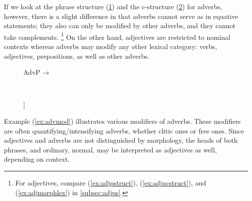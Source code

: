 If we look at the phrase structure (\ref{ex:advpstruct}) and the c-structure
(\ref{ex:advpcstruct}) for adverbs, however, there is a slight difference in
that adverbs cannot serve as \Plink{} in equative statements; they also can
only be modified by other adverbs, and they cannot take complements.%
\footnote{For adjectives, compare (\ref{ex:adjpstruct}),
(\ref{ex:adjpcstruct}), and (\ref{ex:adjmorphlex}) in \autoref{subsec:adjps}.}
On the other hand, adjectives are restricted to nominal contexts whereas
adverbs may modify any other lexical category: verbs, adjectives, prepositions,
as well as other adverbs.

\begin{figure}[h]
\ex\label{ex:advpstruct}
AdvP →  
\xe
\end{figure}

\begin{figure}[h]
\ex~\label{ex:advpcstruct}
\begin{forest}
[{\anno[\elem{\Adjc}]{AdvP}}
		[\anno{\xhead{Adv}}]
		[{\anno[{\elem{\Adjc}}]{AdvP}}]
]
\end{forest}
\xe
\end{figure}

Example (\ref{ex:advmod}) illustrates various modifiers of adverbs. These
modifiers are often quantifying/intensifying adverbs, whether clitic ones or
free ones. Since adjectives and adverbs are not distinguished by morphology,
the heads of both phrases,  and 
{ordinary, normal}, may be interpreted as adjectives as well, depending on
context.

